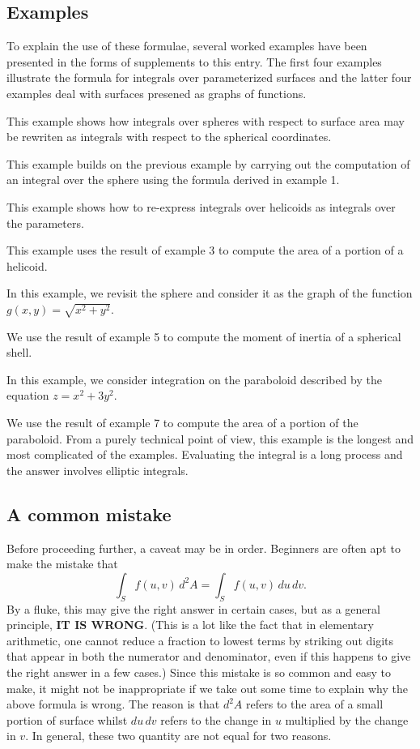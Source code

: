 \documentclass[12pt]{article}
\begin{document}
\subsection{Examples}

To explain the use of these formulae, several worked examples have been presented in the forms of supplements to this entry.  The first four examples illustrate the formula for integrals over parameterized surfaces and the latter four examples deal with surfaces presened as graphs of functions.

  This example shows how integrals over spheres with respect to surface area may be rewriten as integrals with respect to the spherical coordinates.

  This example builds on the previous example by carrying out the computation of an integral over the sphere using the formula derived in example 1.

  This example shows how to re-express integrals over helicoids as integrals over the parameters.

  This example uses the result of example 3 to compute  the area of a portion of a helicoid.

  In this example, we revisit the sphere and consider it as the graph of the function $g(x,y) = \sqrt{x^2 + y^2}$.

  We use the result of example 5 to compute the moment of inertia of a spherical shell.

 In this example, we consider integration on the paraboloid described by the equation $z = x^2 + 3 y^2$.

  We use the result of example 7 to compute the area of a portion of the paraboloid.  From a purely technical point of view, this example is the longest and most complicated of the examples.  Evaluating the integral is a long process and the answer involves elliptic integrals.

\subsection{A common mistake}

Before proceeding further, a caveat may be in order.  Beginners are often apt to make the mistake that
 $$\int_S f(u,v) \, d^2 A = \int_S f(u,v) \, du \, dv.$$
By a fluke, this may give the right answer in certain cases, but as a general principle, {\bf IT IS WRONG}.  (This is a lot like the fact that in elementary arithmetic, one cannot reduce a fraction to lowest terms by striking out digits that appear in both the numerator and denominator, even if this happens to give the right answer in a few cases.)  Since this mistake is so common and easy to make, it might not be inappropriate if we take out some time to explain why the above formula is wrong.  The reason is that $d^2 A$ refers to the area of a small portion of surface whilst $du \, dv$ refers to the change in $u$ multiplied by the change in $v$.  In general, these two quantity are not equal for two reasons.
\end{document}
